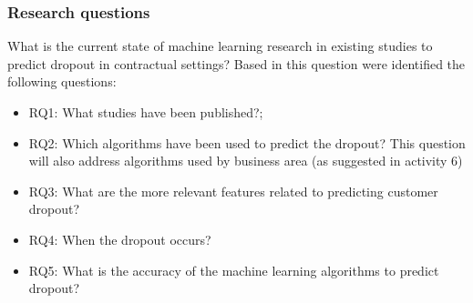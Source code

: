 \documentclass[10pt]{beamer}
\begin{document}
\begin{frame}
	\frametitle{Research questions}
	What is the current state of machine learning research in existing studies to predict dropout in contractual settings? Based in this question were identified the following questions:
	\begin{itemize}
		\item RQ1: What studies have been published?;
		\item RQ2: Which algorithms have been used to predict the dropout? This question will also address algorithms used by business area (as suggested in activity 6)
		\item RQ3: What are the more relevant features related to predicting customer dropout?
		\item RQ4: When the dropout occurs? 
		\item RQ5: What is the accuracy of the machine learning algorithms to predict dropout?
	\end{itemize}
\end{frame}

\end{document}

